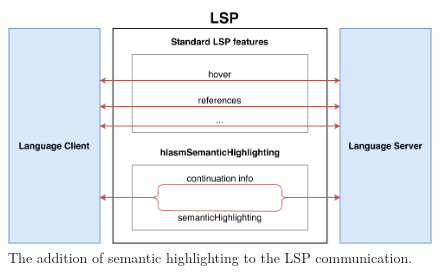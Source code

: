\begin{figure}
	\centering
	\includegraphics[width=\textwidth]{img/lsp_addition}
	\caption{The addition of semantic highlighting to the LSP communication.}
	
	\label{fig08:lsp}
\end{figure}


